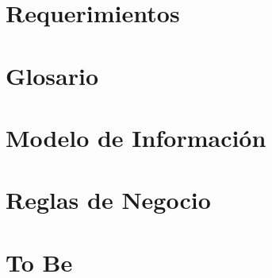 \chapter{Requerimientos}
\label{ch:req}


\chapter{Glosario}
\label{ch:glo}


\chapter{Modelo de Información}
\label{ch:Informacion}


\chapter{Reglas de Negocio}
\label{ch:reglas}


\chapter{To Be}
\label{ch:tobe}






